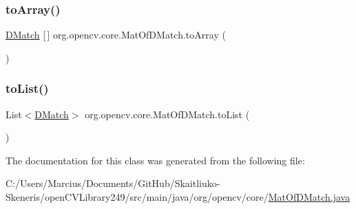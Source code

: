 \subsubsection{\texorpdfstring{to\+Array()}{toArray()}}
{\footnotesize\ttfamily \mbox{\hyperlink{classorg_1_1opencv_1_1features2d_1_1_d_match}{D\+Match}} \mbox{[}$\,$\mbox{]} org.\+opencv.\+core.\+Mat\+Of\+D\+Match.\+to\+Array (\begin{DoxyParamCaption}{ }\end{DoxyParamCaption})}

\mbox{\label{classorg_1_1opencv_1_1core_1_1_mat_of_d_match_a21bab2fd7ef5a59e3aa77b415f9d1521}} 
\subsubsection{\texorpdfstring{to\+List()}{toList()}}
{\footnotesize\ttfamily List$<$\mbox{\hyperlink{classorg_1_1opencv_1_1features2d_1_1_d_match}{D\+Match}}$>$ org.\+opencv.\+core.\+Mat\+Of\+D\+Match.\+to\+List (\begin{DoxyParamCaption}{ }\end{DoxyParamCaption})}



The documentation for this class was generated from the following file\+:\begin{DoxyCompactItemize}
\item 
C\+:/\+Users/\+Marcius/\+Documents/\+Git\+Hub/\+Skaitliuko-\/\+Skeneris/open\+C\+V\+Library249/src/main/java/org/opencv/core/\mbox{\hyperlink{_mat_of_d_match_8java}{Mat\+Of\+D\+Match.\+java}}\end{DoxyCompactItemize}
